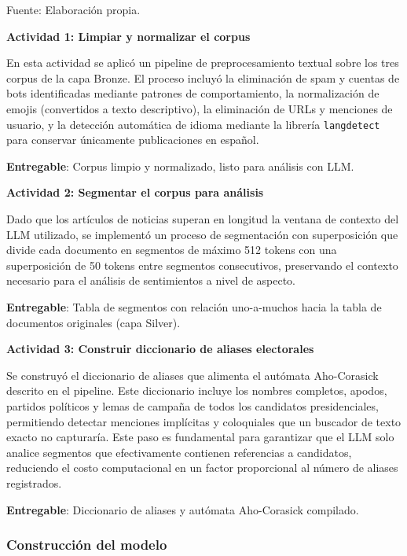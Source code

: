\documentclass[listof=nochaptergap,12pt,times,authoryear]{report}
\begin{document}
\endgroup
\begin{flushleft}
    \small Fuente: Elaboración propia.
\end{flushleft}
 
\textbf{Actividad 1: Limpiar y normalizar el corpus}
 
En esta actividad se aplicó un pipeline de preprocesamiento textual sobre los tres corpus de la capa Bronze. El proceso incluyó la eliminación de spam y cuentas de bots identificadas mediante patrones de comportamiento, la normalización de emojis (convertidos a texto descriptivo), la eliminación de URLs y menciones de usuario, y la detección automática de idioma mediante la librería \texttt{langdetect} para conservar únicamente publicaciones en español.
 
\textbf{Entregable}: Corpus limpio y normalizado, listo para análisis con LLM.
 
\textbf{Actividad 2: Segmentar el corpus para análisis}
 
Dado que los artículos de noticias superan en longitud la ventana de contexto del LLM utilizado, se implementó un proceso de segmentación con superposición que divide cada documento en segmentos de máximo 512 tokens con una superposición de 50 tokens entre segmentos consecutivos, preservando el contexto necesario para el análisis de sentimientos a nivel de aspecto.
 
\textbf{Entregable}: Tabla de segmentos con relación uno-a-muchos hacia la tabla de documentos originales (capa Silver).
 
\textbf{Actividad 3: Construir diccionario de aliases electorales}
 
Se construyó el diccionario de aliases que alimenta el autómata Aho-Corasick descrito en el pipeline. Este diccionario incluye los nombres completos, apodos, partidos políticos y lemas de campaña de todos los candidatos presidenciales, permitiendo detectar menciones implícitas y coloquiales que un buscador de texto exacto no capturaría. Este paso es fundamental para garantizar que el LLM solo analice segmentos que efectivamente contienen referencias a candidatos, reduciendo el costo computacional en un factor proporcional al número de aliases registrados.
 
\textbf{Entregable}: Diccionario de aliases y autómata Aho-Corasick compilado.
 
\subsubsection{Construcción del modelo}
 
\end{document}
